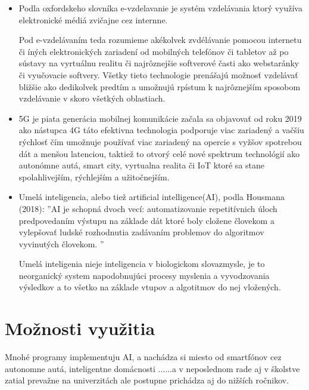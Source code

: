 \documentclass[10pt,oneside,slovak,a4paper]{article}
\begin{document}
\begin{itemize}
\item Podla oxfordskeho slovníka e-vzdelavanie je systém vzdelávania ktorý využíva elektronické médiá zvičajne cez internne. 

Pod e-vzdelávaním teda rozumieme akékolvek zvdélávanie pomocou internetu či íných elektronických zariadení od mobilných telefónov či tabletov až po sústavy na vyrtuálnu realitu či najrôznejšie softverové časti ako webstaránky či vyučovacie softvery. Všetky tieto technologie prenášajú možnosť vzdelávať bližšie ako dedikolvek predtím a umožnujú rpístum k najrôznejším sposobom vzdelávanie v skoro všetkých oblastiach.

\item 
5G je piata generácia mobilnej komunikácie začala sa objavovať od roku 2019 ako nástupca 4G táto efektivna technologia podporuje viac zariadený a vačšiu rýchlosť čím umožnuje používať viac zariadený na opercie s vyžšov spotrebou dát a menšou latenciou, taktiež to otvorý celé nové spektrum technológií ako autonómne autá, smart city, vyrtualna realita či IoT ktoré sa stane spolahlivejším, rýchlejším a užitočnejším.

\item 
Umelá inteligencia, alebo tiež artificial intelligence(AI), podla Housmana (2018): ''AI je schopná dvoch vecí: automatizovanie repetitívnich úloch predpovedaním výstupu na základe dát ktoré boly cložene človekom a vylepšovať ludské rozhodnutia zadávaním problemov do algoritmov vyvinutých človekom. ''

Umelá inteligenia nieje inteligencia v biologickom slovazmysle, je to neorganický system napodobnujúci procesy myslenia a vyvodzovania výsledkov a to všetko na základe vtupov a algotitmov do nej vložených.  



\end{itemize}

\section{Možnosti využitia} 
Mnohé programy implementuju AI, a nachádza si miesto od smartfónov cez autonomne autá, inteligentne domácnosti ......a v neposlednom rade aj v školstve zatial prevažne na univerzitách ale postupne prichádza aj do nižších ročnikov.
\end{document}
